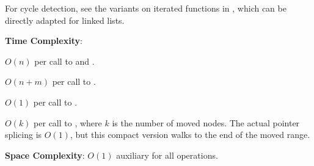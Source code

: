 For cycle detection, see the variants on iterated functions in , which can be directly adapted for linked lists.

\textbf{Time Complexity}:
\begin{compactitem}
  \item $O(n)$ per call to  and .
  \item $O(n + m)$ per call to .
  \item $O(1)$ per call to .
  \item $O(k)$ per call to , where $k$ is the number of moved nodes. The actual pointer splicing is $O(1)$, but this compact version walks to the end of the moved range.
\end{compactitem}

\textbf{Space Complexity}: $O(1)$ auxiliary for all operations.

